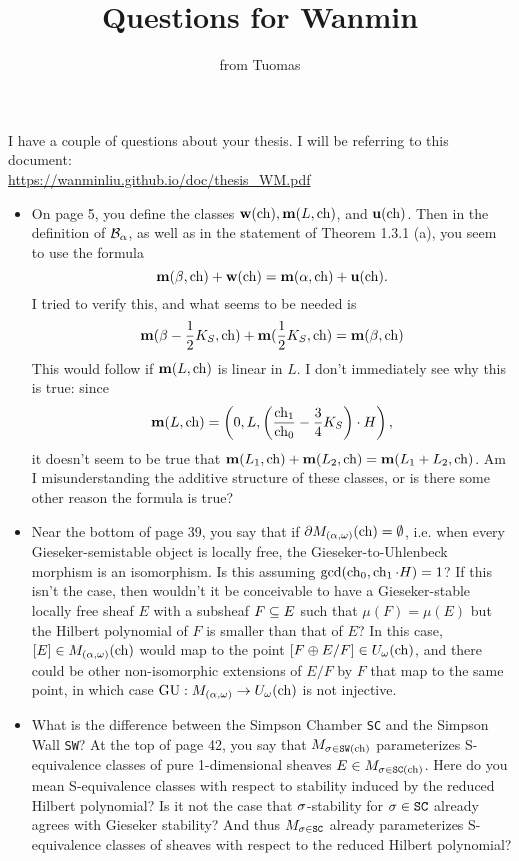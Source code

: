 \documentclass[letterpaper,10pt]{article}
\title{Questions for Wanmin}
\author{from Tuomas}
\date{}
\theoremstyle{remark}
\begin{document}
\maketitle

\noindent I have a couple of questions about your thesis. I will be referring to this document:\\ \url{https://wanminliu.github.io/doc/thesis_WM.pdf}
\begin{itemize}
    \item On page 5, you define the classes $\mathbf{w}(\operatorname{\mathrm{ch}}), \mathbf{m}(L, \operatorname{\mathrm{ch}})$, and $\mathbf{u}(\operatorname{\mathrm{ch}})$. Then in the definition of $
    \mathcal{B}_\alpha$, as well as in the statement of Theorem 1.3.1 (a), you seem to use the formula
    \[ \mathbf{m}(\beta, \operatorname{\mathrm{ch}}) + \mathbf{w}(\operatorname{\mathrm{ch}}) = \mathbf{m}(\alpha, \operatorname{\mathrm{ch}}) + \mathbf{u}(\operatorname{\mathrm{ch}}). \]
    I tried to verify this, and what seems to be needed is 
    \[ \mathbf{m}(\beta - \frac{1}{2} K_S, \operatorname{\mathrm{ch}}) + \mathbf{m}(\frac{1}{2} K_S, \operatorname{\mathrm{ch}}) = \mathbf{m}(\beta, \operatorname{\mathrm{ch}}) \] 
    This would follow if $\mathbf{m}(L, \operatorname{\mathrm{ch}})$ is linear in $L$. I don't immediately see why this is true: since
    \[ \mathbf{m}(L, \operatorname{\mathrm{ch}}) = \left(0, L, \left(\frac{\operatorname{\mathrm{ch}}_1}{\operatorname{\mathrm{ch}}_0} - \frac{3}{4} K_S\right)\cdot H \right), \]
    it doesn't seem to be true that $\mathbf{m}(L_1, \operatorname{\mathrm{ch}}) + \mathbf{m}(L_2, \operatorname{\mathrm{ch}}) = \mathbf{m}(L_1 + L_2, \operatorname{\mathrm{ch}})$. Am I misunderstanding the additive structure of these classes, or is there some other reason the formula is true?
    
    \item Near the bottom of page 39, you say that if $\partial M_{(\alpha, \omega)}(\operatorname{\mathrm{ch}}) = \emptyset$, i.e. when every Gieseker-semistable object is locally free, the Gieseker-to-Uhlenbeck morphism is an isomorphism. Is this assuming $\gcd(\operatorname{\mathrm{ch}}_0, \operatorname{\mathrm{ch}}_1 \cdot H) = 1$? If this isn't the case, then wouldn't it be conceivable to have a Gieseker-stable locally free sheaf $E$ with a subsheaf $F \subseteq E$ such that $\mu(F) = \mu(E)$ but the Hilbert polynomial of $F$ is smaller than that of $E$? In this case, $[E] \in M_{(\alpha,\omega)}(\operatorname{\mathrm{ch}})$ would map to the point $[F \oplus E/F] \in U_\omega(\operatorname{\mathrm{ch}})$, and there could be other non-isomorphic extensions of $E/F$ by $F$ that map to the same point, in which case $\mathrm{GU}: M_{(\alpha,\omega)} \to U_\omega(\operatorname{\mathrm{ch}})$ is not injective.
    
    \item What is the difference between the Simpson Chamber \texttt{SC} and the Simpson Wall \texttt{SW}? At the top of page 42, you say that $M_{\sigma \in \texttt{SW}(\operatorname{\mathrm{ch}})}$ parameterizes S-equivalence classes of pure 1-dimensional sheaves $E \in M_{\sigma \in \texttt{SC}(\operatorname{\mathrm{ch}})}$. Here do you mean S-equivalence classes with respect to stability induced by the reduced Hilbert polynomial? Is it not the case that $\sigma$-stability for $\sigma \in \texttt{SC}$ already agrees with Gieseker stability? And thus $M_{\sigma \in \texttt{SC}}$ already parameterizes S-equivalence classes of sheaves with respect to the reduced Hilbert polynomial?
\end{itemize}
\end{document}
